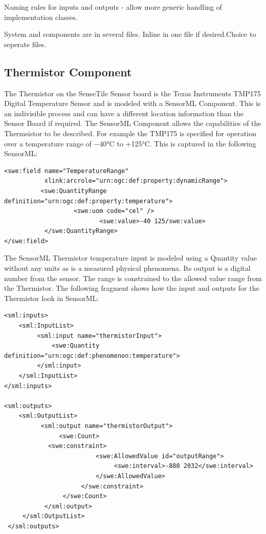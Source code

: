 \documentclass[]{final_report}
\begin{document}
Naming rules for inputs and outputs - allow more generic handling of implementation classes.

System and components are in several files. Inline in one file if desired.Choice to seperate files.

\subsection{Thermistor Component}
The Thermistor on the SenseTile Sensor board is the Texas Instruments TMP175 Digital Temperature Sensor and is modeled with a SensorML Component. This is an indivisible process and can have a different location information than the Sensor Board if required. The SensorML Component allows the capabilities of the Thermsistor to be described. For example the TMP175 is  specified for operation over a temperature range of −40°C to +125°C. This is captured in the following SensorML:

\begin{lstlisting}
<swe:field name="TemperatureRange" 
           xlink:arcrole="urn:ogc:def:property:dynamicRange">
          <swe:QuantityRange definition="urn:ogc:def:property:temperature">
                   <swe:uom code="cel" /> 
                          <swe:value>-40 125/swe:value> 
           </swe:QuantityRange>
</swe:field>
\end{lstlisting}

The SensorML Thermistor temperature input is modeled using a Quantity value without any units as is a measured physical phenomena. Its output is a digital number from the sensor. The range is constrained to the allowed value range from the Thermistor. The following fragment shows how the input and outputs for the Thermistor look in SensorML:

\begin{lstlisting}
<sml:inputs>
    <sml:InputList>
         <sml:input name="thermistorInput">
             <swe:Quantity definition="urn:ogc:def:phenomenon:temperature">
         </sml:input>
    </sml:InputList>
</sml:inputs>

<sml:outputs>
    <sml:OutputList>
          <sml:output name="thermistorOutput">
               <swe:Count>
	        <swe:constraint>
                         <swe:AllowedValue id="outputRange">
                              <swe:interval>-880 2032</swe:interval>
                         </swe:AllowedValue>
                     </swe:constraint>
                </swe:Count>
           </sml:output>
     </sml:OutputList>
 </sml:outputs>
\end{lstlisting}
\end{document}
